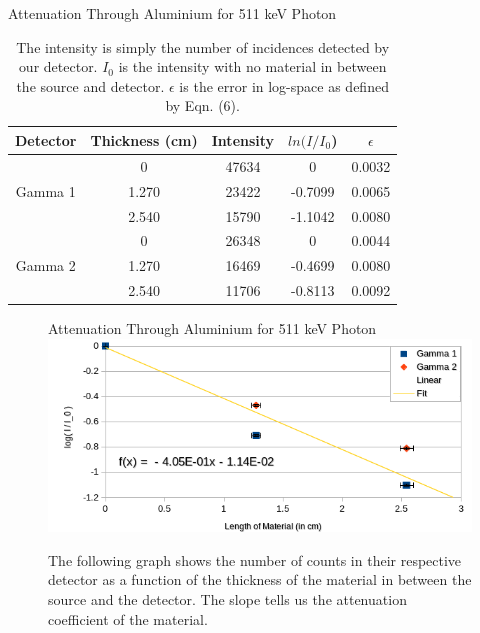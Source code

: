 \documentclass[10pt]{IEEEtran}
\begin{document}
    \begin{table}[!hbpt]
      \begin{center}
        \normalsize{Attenuation Through Aluminium for 511 keV Photon}
        \begin{tabular}{|c|c|c|c|c|}	
		   \hline        	
		   Detector & Thickness (cm) & Intensity & $ln(I/I_0$) & $\epsilon$ \\
            \hline
            \multirow{3}{*}{Gamma 1} & 0 & 47634 & 0 & 0.0032 \\
            \hhline{~----}
	        & 1.270 & 23422 & -0.7099 & 0.0065 \\
	        \hhline{~----}
            & 2.540 & 15790 & -1.1042 & 0.0080 \\
            \hline
            \multirow{3}{*}{Gamma 2} & 0 & 26348 & 0 & 0.0044 \\
            \hhline{~----}
            & 1.270 & 16469 & -0.4699 & 0.0080 \\
            \hhline{~----}
            & 2.540 & 11706 & -0.8113 & 0.0092 \\
            \hline
       \end{tabular}
       \caption{The intensity is simply the number of incidences detected by our detector. $I_0$ is the intensity with no material in between the source and detector. $\epsilon$ is the error in log-space as defined by Eqn. (6).}
       \label{tab:aluminium511}
      \end{center}
    \end{table} 

    \begin{figure}[!hbt]
        \begin{center}
			\normalsize{Attenuation Through Aluminium for 511 keV Photon}
			\includegraphics[width=\linewidth]{Attenuation511Al}
			\caption{The following graph shows the number of counts in their respective detector as a function of the thickness of the material in between the source and the detector. The slope tells us the attenuation coefficient of the material.}
			\label{fig:511Al}
         \end{center}
    \end{figure}  
\end{document}

